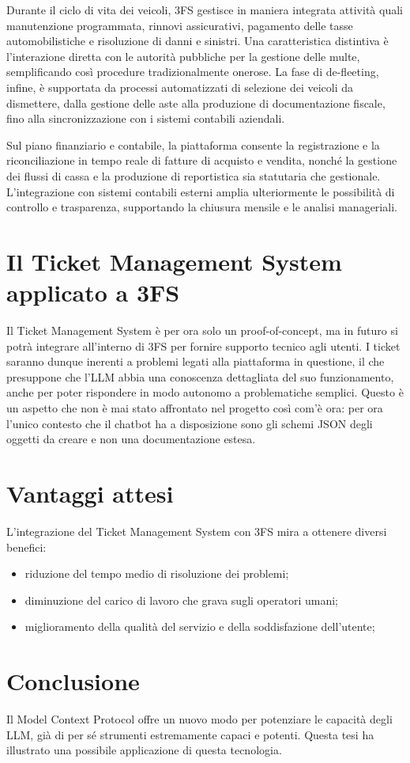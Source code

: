 Durante il ciclo di vita dei veicoli, 3FS{\textsuperscript{\tiny\textcopyright}} gestisce in maniera integrata attività quali manutenzione programmata, rinnovi assicurativi,
pagamento delle tasse automobilistiche e risoluzione di danni e sinistri. Una caratteristica distintiva è l'interazione diretta con le autorità
pubbliche per la gestione delle multe, semplificando così procedure tradizionalmente onerose. La fase di de-fleeting, infine, è supportata
da processi automatizzati di selezione dei veicoli da dismettere, dalla gestione delle aste alla produzione di documentazione fiscale, fino
alla sincronizzazione con i sistemi contabili aziendali.

Sul piano finanziario e contabile, la piattaforma consente la registrazione e la riconciliazione in tempo reale di fatture di acquisto e vendita,
nonché la gestione dei flussi di cassa e la produzione di reportistica sia statutaria che gestionale. L'integrazione con sistemi contabili esterni
amplia ulteriormente le possibilità di controllo e trasparenza, supportando la chiusura mensile e le analisi manageriali. \cite{progesoftware_3fs}

\newpage
\section{\texorpdfstring{Il Ticket Management System applicato a 3FS{\textsuperscript{\tiny\textcopyright}}}{Il Ticket Management System applicato a 3FS (c)}}
Il Ticket Management System è per ora solo un proof-of-concept, ma in futuro si potrà integrare all'interno di 3FS{\textsuperscript{\tiny\textcopyright}} per fornire supporto tecnico agli utenti.
I ticket saranno dunque inerenti a problemi legati alla piattaforma in questione, il che presuppone che l'LLM abbia una conoscenza dettagliata del suo funzionamento,
anche per poter rispondere in modo autonomo a problematiche semplici.
Questo è un aspetto che non è mai stato affrontato nel progetto così com'è ora: per ora l'unico contesto che il chatbot ha a disposizione sono gli schemi JSON degli oggetti
da creare e non una documentazione estesa.

\newpage
\section{Vantaggi attesi}
L'integrazione del Ticket Management System con 3FS{\textsuperscript{\tiny\textcopyright}} mira a ottenere diversi benefici:
\begin{itemize}
    \item riduzione del tempo medio di risoluzione dei problemi;
    \item diminuzione del carico di lavoro che grava sugli operatori umani;
    \item miglioramento della qualità del servizio e della soddisfazione dell'utente;
\end{itemize}

\newpage
\section{Conclusione}
Il Model Context Protocol offre un nuovo modo per potenziare le capacità degli LLM, già di per sé strumenti estremamente capaci e potenti.
Questa tesi ha illustrato una possibile applicazione di questa tecnologia.